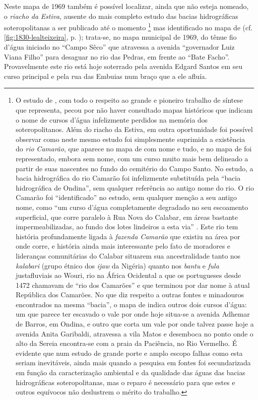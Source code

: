 Neste mapa de 1969 também é possível localizar, ainda que não esteja nomeado, o \textit{riacho da Estiva}, ausente do mais completo estudo das bacias hidrográficas soteropolitanas a ser publicado até o momento \cite{santos_aguas_2010}\footnote{O estudo de , com todo o respeito ao grande e pioneiro trabalho de síntese que representa, pecou por não haver consultado mapas históricos que indicam o nome de cursos d'água infelizmente perdidos na memória dos soteropolitanos. Além do riacho da Estiva, em outra oportunidade foi possível observar como neste mesmo estudo foi simplesmente suprimida a existência do \textit{rio Camarão}, que aparece no mapa de  com nome e tudo, e no mapa de  foi representado, embora sem nome, com um curso muito mais bem delineado a partir de suas nascentes no fundo do cemitério do Campo Santo. No estudo, a bacia hidrográfica do rio Camarão foi infelizmente substituída pela ``bacia hidrográfica de Ondina'', sem qualquer referência ao antigo nome do rio. O rio Camarão foi ``identificado'' no estudo, sem qualquer menção a seu antigo nome, como ``um curso d’água completamente degradado no seu escoamento superficial, que corre paralelo à Rua Nova do Calabar, em áreas bastante impermeabilizadas, ao fundo dos lotes lindeiros a esta via'' . Este rio tem história profundamente ligada à \textit{fazenda Camarão} que existiu na área por onde corre, e história ainda mais interessante pelo fato de moradores e lideranças comunitárias do Calabar situarem sua ancestralidade tanto nos \textit{kalabari} (grupo étnico dos \textit{ijaw} da Nigéria) quanto nos \textit{bantu} e \textit{fula} justafluviais ao Wouri, rio na África Ocidental a que os portugueses desde 1472 chamavam de ``rio dos Camarões'' e que terminou por dar nome à atual República dos Camarões. No que diz respeito a outras fontes e minadouros encontrados na mesma ``bacia'', o mapa de  indica outros dois cursos d'água: um que parece ter escavado o vale por onde hoje situa-se a avenida Adhemar de Barros, em Ondina, e outro que corta um vale por onde talvez passe hoje a avenida Anita Garibaldi, atravessa a vila Matos e desemboca no ponto onde o alto da Sereia encontra-se com a praia da Paciência, no Rio Vermelho. É evidente que num estudo de grande porte e amplo escopo falhas como esta seriam inevitáveis, ainda mais quando a pesquisa em fontes foi secundarizada em função da caracterização ambiental e da qualidade das águas das bacias hidrográficas soteropolitanas, mas o reparo é necessário para que estes e outros equívocos não deslustrem o mérito do trabalho.} mas identificado no mapa de  (cf. \autoref{fig:1830-lealteixeira}, p. \pageref{fig:1830-lealteixeira}); trata-se, no mapa municipal de 1969, do tênue fio d'água iniciado no ``Campo Sêco'' que atravessa a avenida ``governador Luiz Viana Filho'' para desaguar no rio das Pedras, em frente ao ``Bate Facho''. Provavelmente este rio está hoje soterrado pela avenida Edgard Santos em seu curso principal e pela rua das Embuias num braço que a ele afluía.

